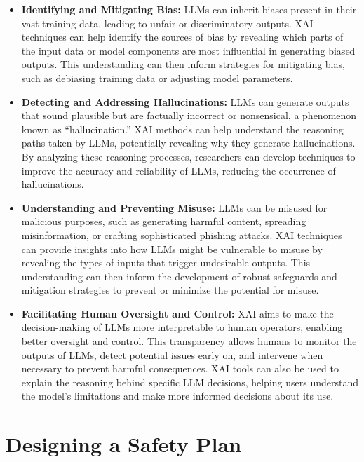 \begin{itemize}
    \item \textbf{Identifying and Mitigating Bias:} LLMs can inherit biases present in their vast training data, leading to unfair or discriminatory outputs. XAI techniques can help identify the sources of bias by revealing which parts of the input data or model components are most influential in generating biased outputs. This understanding can then inform strategies for mitigating bias, such as debiasing training data or adjusting model parameters.
    
    \item \textbf{Detecting and Addressing Hallucinations:} LLMs can generate outputs that sound plausible but are factually incorrect or nonsensical, a phenomenon known as ``hallucination.'' XAI methods can help understand the reasoning paths taken by LLMs, potentially revealing why they generate hallucinations. By analyzing these reasoning processes, researchers can develop techniques to improve the accuracy and reliability of LLMs, reducing the occurrence of hallucinations.
    
    \item \textbf{Understanding and Preventing Misuse:} LLMs can be misused for malicious purposes, such as generating harmful content, spreading misinformation, or crafting sophisticated phishing attacks. XAI techniques can provide insights into how LLMs might be vulnerable to misuse by revealing the types of inputs that trigger undesirable outputs. This understanding can then inform the development of robust safeguards and mitigation strategies to prevent or minimize the potential for misuse.
    
    \item \textbf{Facilitating Human Oversight and Control:} XAI aims to make the decision-making of LLMs more interpretable to human operators, enabling better oversight and control. This transparency allows humans to monitor the outputs of LLMs, detect potential issues early on, and intervene when necessary to prevent harmful consequences. XAI tools can also be used to explain the reasoning behind specific LLM decisions, helping users understand the model's limitations and make more informed decisions about its use.
\end{itemize}
\section{Designing a Safety Plan}

